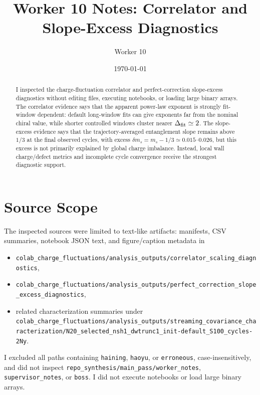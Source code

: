 \documentclass[aps,prb,onecolumn,nofootinbib,superscriptaddress]{revtex4-2}
\begin{document}
\title{Worker 10 Notes: Correlator and Slope-Excess Diagnostics}
\author{Worker 10}
\date{\today}

\begin{abstract}
I inspected the charge-fluctuation correlator and perfect-correction slope-excess diagnostics without editing files, executing notebooks, or loading large binary arrays. The correlator evidence says that the apparent power-law exponent is strongly fit-window dependent: default long-window fits can give exponents far from the nominal chiral value, while shorter controlled windows cluster nearer $\Delta_{\rm fit}\simeq 2$. The slope-excess evidence says that the trajectory-averaged entanglement slope remains above $1/3$ at the final observed cycles, with excess $\delta m_s=m_s-1/3\simeq 0.015$--$0.026$, but this excess is not primarily explained by global charge imbalance. Instead, local wall charge/defect metrics and incomplete cycle convergence receive the strongest diagnostic support.
\end{abstract}

\maketitle
\setcounter{tocdepth}{2}
\tableofcontents

\section{Source Scope}

The inspected sources were limited to text-like artifacts: manifests, CSV summaries, notebook JSON text, and figure/caption metadata in
\begin{itemize}
\item \texttt{colab\_charge\_fluctuations/analysis\_outputs/correlator\_scaling\_diagnostics},
\item \texttt{colab\_charge\_fluctuations/analysis\_outputs/perfect\_correction\_slope\_excess\_diagnostics},
\item related characterization summaries under \texttt{colab\_charge\_fluctuations/analysis\_outputs/streaming\_covariance\_characterization/N20\_selected\_nsh1\_dwtrunc1\_init-default\_S100\_cycles-2Ny}.
\end{itemize}
I excluded all paths containing \texttt{haining}, \texttt{haoyu}, or \texttt{erroneous}, case-insensitively, and did not inspect \texttt{repo\_synthesis/main\_pass/worker\_notes}, \texttt{supervisor\_notes}, or \texttt{boss}. I did not execute notebooks or load large binary arrays.
\end{document}
